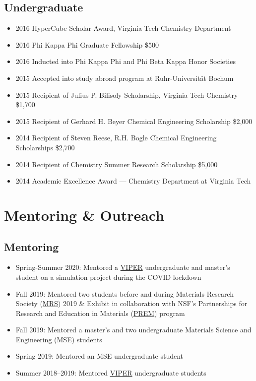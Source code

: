 \documentclass[11pt]{article} %
\begin{document}
\subsection*{Undergraduate}
\begin{itemize}
  \item 2016 HyperCube Scholar Award, Virginia Tech Chemistry Department
  \item 2016 Phi Kappa Phi Graduate Fellowship \hfill \$500
  \item 2016 Inducted into Phi Kappa Phi and Phi Beta Kappa Honor Societies
  \item 2015 Accepted into study abroad program at Ruhr-Universität Bochum \hfill
  \item 2015 Recipient of Julius P. Bilisoly Scholarship, Virginia Tech Chemistry \hfill \$1,700
  \item 2015 Recipient of Gerhard H. Beyer Chemical Engineering Scholarship \hfill \$2,000
  \item 2014 Recipient of Steven Reese, R.H. Bogle Chemical Engineering Scholarships \hfill \$2,700
  \item 2014 Recipient of Chemistry Summer Research Scholarship \hfill \$5,000
  \item 2014 Academic Excellence Award --- Chemistry Department at Virginia Tech
\end{itemize}

\section{Mentoring \& Outreach}
\subsection{Mentoring}
\begin{itemize}
  \item Spring-Summer 2020: Mentored a \href{https://www.viper.upenn.edu/}{VIPER} undergraduate and master's student on a simulation project during the COVID lockdown
  \item Fall 2019: Mentored two students before and during Materials Research Society (\href{https://www.mrs.org/}{MRS}) 2019 \& Exhibit in collaboration with NSF's Partnerships for Research and Education in Materials (\href{https://new.nsf.gov/funding/opportunities/prem-partnerships-research-education-materials}{PREM}) program
  \item Fall 2019: Mentored a master’s and two undergraduate Materials Science and Engineering (MSE) students
  \item Spring 2019: Mentored an MSE undergraduate student
  \item Summer 2018--2019: Mentored \href{https://www.viper.upenn.edu/}{VIPER} undergraduate students
\end{itemize}
\end{document}
